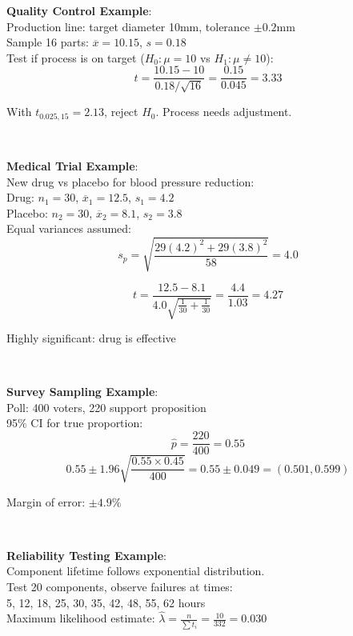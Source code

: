 \documentclass{article}
\newenvironment{cheatformula}[1][Title]{
    \begin{minipage}{\linewidth}
    \textbf{#1}:\\
}{
    \end{minipage}\\[2ex]
}
\begin{document}
\begin{multicols*}{2}
\begin{cheatformula}[Quality Control Example]
    Production line: target diameter 10mm, tolerance $\pm 0.2$mm\\
    Sample 16 parts: $\overline{x} = 10.15$, $s = 0.18$\\
    
    Test if process is on target ($H_0: \mu = 10$ vs $H_1: \mu \neq 10$):
    $$t = \frac{10.15 - 10}{0.18/\sqrt{16}} = \frac{0.15}{0.045} = 3.33$$
    
    With $t_{0.025,15} = 2.13$, reject $H_0$. Process needs adjustment.
\end{cheatformula}

\begin{cheatformula}[Medical Trial Example]
    New drug vs placebo for blood pressure reduction:\\
    Drug: $n_1 = 30$, $\overline{x}_1 = 12.5$, $s_1 = 4.2$\\
    Placebo: $n_2 = 30$, $\overline{x}_2 = 8.1$, $s_2 = 3.8$\\
    
    Equal variances assumed:
    $$s_p = \sqrt{\frac{29(4.2)^2 + 29(3.8)^2}{58}} = 4.0$$
    
    $$t = \frac{12.5 - 8.1}{4.0\sqrt{\frac{1}{30} + \frac{1}{30}}} = \frac{4.4}{1.03} = 4.27$$
    
    Highly significant: drug is effective
\end{cheatformula}

\begin{cheatformula}[Survey Sampling Example]
    Poll: 400 voters, 220 support proposition\\
    95\% CI for true proportion:
    $$\hat{p} = \frac{220}{400} = 0.55$$
    $$0.55 \pm 1.96\sqrt{\frac{0.55 \times 0.45}{400}} = 0.55 \pm 0.049 = (0.501, 0.599)$$
    
    Margin of error: $\pm 4.9\%$
\end{cheatformula}

\begin{cheatformula}[Reliability Testing Example]
    Component lifetime follows exponential distribution.\\
    Test 20 components, observe failures at times:\\
    5, 12, 18, 25, 30, 35, 42, 48, 55, 62 hours\\
    
    Maximum likelihood estimate: $\hat{\lambda} = \frac{n}{\sum t_i} = \frac{10}{332} = 0.030$\\
    

\end{cheatformula}
\end{multicols*}
\end{document}
